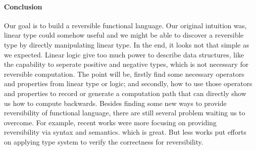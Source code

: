 \documentclass[a4paper,twocolumn]{article}
\begin{document}
\paragraph{Conclusion}
Our goal is to build a reversible functional language. Our original intuition was, linear type could somehow useful and we might be able to discover a reversible type by directly manipulating linear type. In the end, it looks not that simple as we expected. Linear logic give too much power to describe data structures, like the capability to seperate positive and negative types, which is not necessary for reversible computation. The point will be, firstly find some necessary operators and properties from linear type or logic; and secondly, how to use those operators and properties to record or generate a computation path that can directly show us how to compute backwards. Besides finding some new ways to provide reversibility of functional language, there are still several problem waiting us to overcome. For example, recent works were more focusing on providing reversibility via syntax and semantics. which is great. But less works put efforts on applying type system to verify the correctness for reversibility. 





\end{document}
